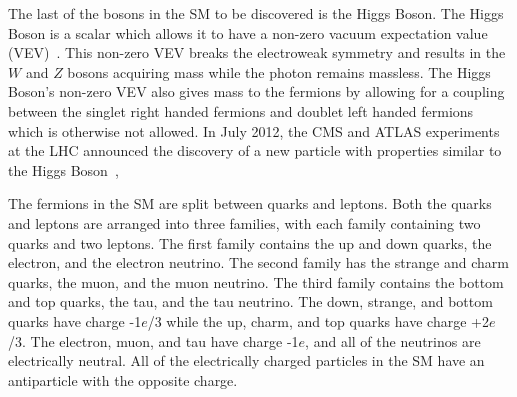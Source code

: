 The last of the bosons in the SM to be discovered is the Higgs Boson. The Higgs Boson is a scalar which allows it to have a non-zero vacuum expectation value 
(VEV)~\cite{PhysRevLett.13.508, PhysRevLett.13.321}.
This non-zero VEV breaks the electroweak symmetry and results in the $W$ and $Z$ bosons acquiring mass while the photon remains massless.
The Higgs Boson's non-zero VEV also gives mass to the fermions by allowing for a coupling between the singlet right handed fermions and doublet left handed fermions
which is otherwise not allowed.
In July 2012, the CMS and ATLAS experiments at the LHC
announced the discovery of a new particle with properties similar to the Higgs Boson~\cite{Chatrchyan:2012ufa, Aad:2012tfa},

The fermions in the SM are split between quarks and leptons. Both the quarks and leptons are arranged into three families,
with each family containing two quarks and two leptons. 
The first family contains the up and down quarks, the electron, and the electron neutrino.
The second family has the strange and charm quarks, the muon, and the muon neutrino. The third family contains the bottom and top quarks,
the tau, and the tau neutrino. The down, strange, and bottom quarks have charge -1$e$/3 while the up, charm, and top quarks have charge +2$e$/3.
The electron, muon, and tau have charge -1$e$, and all of the neutrinos are electrically neutral. All of the electrically charged particles in the SM have
an antiparticle with the opposite charge.


